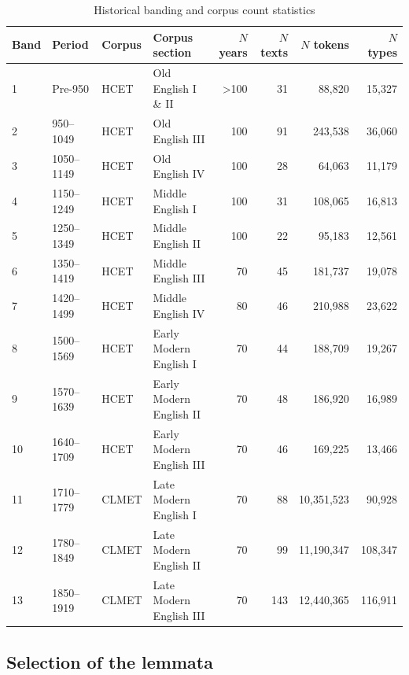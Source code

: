 \documentclass[doc,biblatex]{apa7}
\begin{document}
	\begin{table}
	\begin{center}
	\begin{threeparttable}
	\caption{Historical banding and corpus count statistics}
	\footnotesize
	\begin{tabular}{llllrrrr}
	\toprule
	Band & Period & Corpus & Corpus section & $N$ years & $N$ texts & $N$ tokens & $N$ types \\
	\midrule
	 1 & Pre-950    & HCET  & Old English I \& II      & >100 &  31 & 88,820     & 15,327 \\
	 2 & 950--1049  & HCET  & Old English III          &  100 &  91 & 243,538    & 36,060 \\
	 3 & 1050--1149 & HCET  & Old English IV           &  100 &  28 & 64,063     & 11,179 \\
	 4 & 1150--1249 & HCET  & Middle English I         &  100 &  31 & 108,065    & 16,813 \\
	 5 & 1250--1349 & HCET  & Middle English II        &  100 &  22 & 95,183     & 12,561 \\
	 6 & 1350--1419 & HCET  & Middle English III       &   70 &  45 & 181,737    & 19,078 \\
	 7 & 1420--1499 & HCET  & Middle English IV        &   80 &  46 & 210,988    & 23,622 \\
	 8 & 1500--1569 & HCET  & Early Modern English I   &   70 &  44 & 188,709    & 19,267 \\
	 9 & 1570--1639 & HCET  & Early Modern English II  &   70 &  48 & 186,920    & 16,989 \\
	10 & 1640--1709 & HCET  & Early Modern English III &   70 &  46 & 169,225    & 13,466 \\
	11 & 1710--1779 & CLMET & Late Modern English I    &   70 &  88 & 10,351,523 & 90,928 \\
	12 & 1780--1849 & CLMET & Late Modern English II   &   70 &  99 & 11,190,347 & 108,347 \\
	13 & 1850--1919 & CLMET & Late Modern English III  &   70 & 143 & 12,440,365 & 116,911 \\
	\bottomrule
	\end{tabular}
	\label{banding}
	\end{threeparttable}
	\end{center}
	\end{table}

\subsection{Selection of the lemmata}
\end{document}
